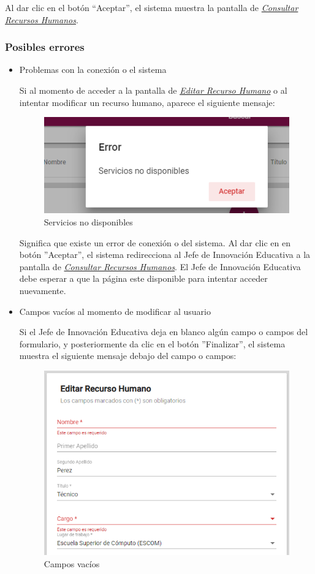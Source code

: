                 Al dar clic en el botón “Aceptar”, el sistema muestra la pantalla de \hyperlink{consultarRH}{\textit{Consultar Recursos Humanos}}.

                \subsubsection{Posibles errores}
                    \begin{itemize}
                        \item Problemas con la conexión o el sistema

                            Si al momento de acceder a la pantalla de \hyperlink{editarRH}{\textit{Editar Recurso Humano}} o al intentar modificar un recurso humano, aparece el siguiente mensaje:
                            \clearpage
                            \begin{figure}[H]
                                \centering
                                \includegraphics[width=0.4\linewidth]{images/SP1/MSGSN}
                                \caption{Servicios no disponibles}

                            \end{figure}


                            Significa que existe un error de conexión o del sistema. Al dar clic en en botón ''Aceptar'', el sistema redirecciona al Jefe de Innovación Educativa a la pantalla de \hyperlink{consultarRH}{\textit{Consultar Recursos Humanos}}. El Jefe de Innovación Educativa debe esperar a que la página este disponible para intentar acceder nuevamente.

                        \item Campos vacíos al momento de modificar al usuario

                            Si el Jefe de Innovación Educativa deja en blanco algún campo o campos del formulario, y posteriormente da clic en el botón ''Finalizar'', el sistema muestra el siguiente mensaje debajo del campo o campos:

                          \begin{figure}[H]
                            \centering
                            \includegraphics[width=0.4\linewidth]{images/SP1/MSG44-1}
                            \caption{Campos vacíos}
                            \label{mensaje44}


\end{figure}
\end{itemize}
